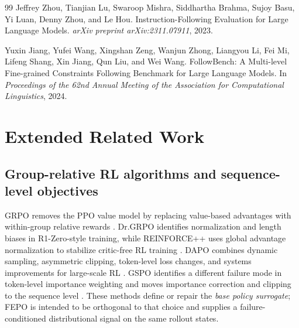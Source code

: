 \documentclass{article}
\newcommand{\FEPO}{\textsc{FEPO}\xspace}
\begin{document}
\begin{thebibliography}{99}
Jeffrey Zhou, Tianjian Lu, Swaroop Mishra, Siddhartha Brahma, Sujoy Basu, Yi Luan, Denny Zhou, and Le Hou.
\newblock Instruction-Following Evaluation for Large Language Models.
\newblock \emph{arXiv preprint arXiv:2311.07911}, 2023.

Yuxin Jiang, Yufei Wang, Xingshan Zeng, Wanjun Zhong, Liangyou Li, Fei Mi, Lifeng Shang, Xin Jiang, Qun Liu, and Wei Wang.
\newblock FollowBench: A Multi-level Fine-grained Constraints Following Benchmark for Large Language Models.
\newblock In \emph{Proceedings of the 62nd Annual Meeting of the Association for Computational Linguistics}, 2024.

\end{thebibliography}


\appendix
\section{Extended Related Work}
\label{app:related}
\subsection{Group-relative RL algorithms and sequence-level objectives}
GRPO removes the PPO value model by replacing value-based advantages with within-group relative rewards \citep{deepseekmath2024}. Dr.GRPO identifies normalization and length biases in R1-Zero-style training, while REINFORCE++ uses global advantage normalization to stabilize critic-free RL training \citep{liu2025understanding,hu2025reinforcepp}. DAPO combines dynamic sampling, asymmetric clipping, token-level loss changes, and systems improvements for large-scale RL \citep{yu2025dapo}. GSPO identifies a different failure mode in token-level importance weighting and moves importance correction and clipping to the sequence level \citep{zheng2025gspo}. These methods define or repair the \emph{base policy surrogate}; \FEPO is intended to be orthogonal to that choice and supplies a failure-conditioned distributional signal on the same rollout states.
\end{document}
